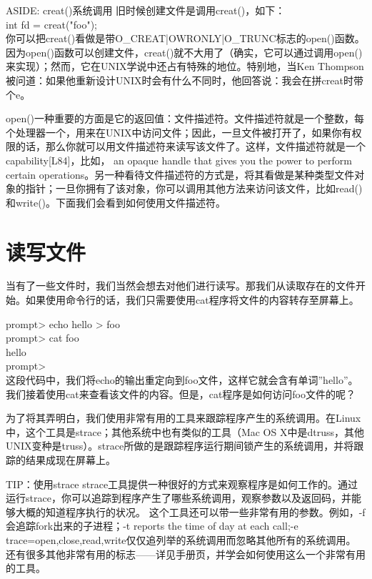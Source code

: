 ASIDE: creat()系统调用
旧时候创建文件是调用creat()，如下：\\
int fd = creat("foo");\\
你可以把creat()看做是带O\_CREAT|OWRONLY|O\_TRUNC标志的open()函数。因为open()函数可以创建文件，creat()就不大用了（确实，它可以通过调用open()来实现）；然而，它在UNIX学说中还占有特殊的地位。特别地，当Ken Thompson被问道：如果他重新设计UNIX时会有什么不同时，他回答说：我会在拼creat时带个e。

open()一种重要的方面是它的返回值：文件描述符。文件描述符就是一个整数，每个处理器一个，用来在UNIX中访问文件；因此，一旦文件被打开了，如果你有权限的话，那么你就可以用文件描述符来读写该文件了。这样，文件描述符就是一个capability[L84]，比如，
an opaque handle that gives you the power to perform certain operations。另一种看待文件描述符的方式是，将其看做是某种类型文件对象的指针；一旦你拥有了该对象，你可以调用其他方法来访问该文件，比如read()和write()。下面我们会看到如何使用文件描述符。

\section{读写文件}

当有了一些文件时，我们当然会想去对他们进行读写。那我们从读取存在的文件开始。如果使用命令行的话，我们只需要使用cat程序将文件的内容转存至屏幕上。

prompt> echo hello > foo\\
prompt> cat foo\\
hello\\
prompt>\\

这段代码中，我们将echo的输出重定向到foo文件，这样它就会含有单词”hello”。我们接着使用cat来查看该文件的内容。但是，cat程序是如何访问foo文件的呢？

为了将其弄明白，我们使用非常有用的工具来跟踪程序产生的系统调用。在Linux中，这个工具是strace；其他系统中也有类似的工具（Mac OS X中是dtruss，其他UNIX变种是truss）。strace所做的是跟踪程序运行期间锁产生的系统调用，并将跟踪的结果成现在屏幕上。

TIP：使用strace
strace工具提供一种很好的方式来观察程序是如何工作的。通过运行strace，你可以追踪到程序产生了哪些系统调用，观察参数以及返回码，并能够大概的知道程序执行的状况。
这个工具还可以带一些非常有用的参数。例如，-f会追踪fork出来的子进程；-t reports the time of day at each call;-e trace=open,close,read,write仅仅追列举的系统调用而忽略其他所有的系统调用。还有很多其他非常有用的标志——详见手册页，并学会如何使用这么一个非常有用的工具。


